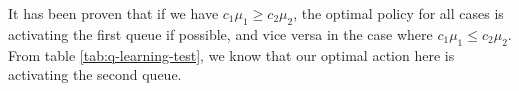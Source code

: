 \documentclass[
  a4paper, xcolor = usenames,dvipsnames]{article}
\begin{document}
It has been proven that if we have \(c_{1} \mu_{1} \ge c_{2} \mu_{2}\), the optimal policy for all cases is activating the first queue if possible, and vice versa in the case where \(c_{1} \mu_{1} \le c_{2} \mu_{2}\). From table \ref{tab:q-learning-test}, we know that our optimal action here is activating the second queue.
\end{document}
